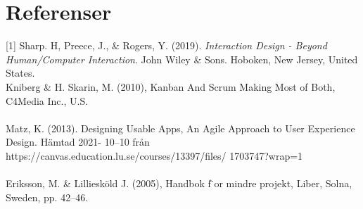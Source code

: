 \documentclass[12pt]{article}
\begin{document}
\section{Referenser}
[1] Sharp. H, Preece, J., \& Rogers, Y. (2019). \textit{Interaction Design - Beyond Human/Computer Interaction}. John Wiley \& Sons. Hoboken, New Jersey, United States. \\

\noindent
[2] Kniberg \& H. Skarin, M. (2010), Kanban And Scrum Making Most of Both, C4Media Inc., U.S. \\\\
\noindent
[3] Matz, K. (2013). Designing Usable Apps, An Agile Approach to User Experience Design. Hämtad 2021-
10–10 från https://canvas.education.lu.se/courses/13397/files/
1703747?wrap=1 \\\\
\noindent
[4] Eriksson, M. \& Lilliesköld J. (2005), Handbok f ̈or mindre projekt, Liber, Solna, Sweden, pp. 42–46.

\end{document}
